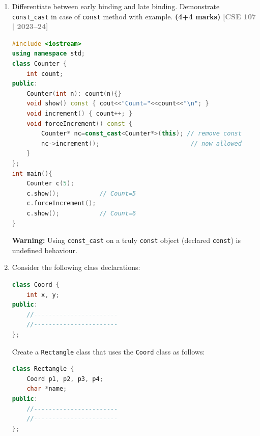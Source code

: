 \documentclass[12pt,a3paper]{article}
\newcommand{\yr}[1]{\hfill\textcolor{gray}{\small\textbf{[#1]}}}
\newcommand{\mk}[1]{\textcolor{orange!70!black}{\small\textbf{(#1 marks)}}}
\begin{document}
\begin{enumerate}
\item Differentiate between early binding and late binding. Demonstrate \texttt{const\_cast} in case of \texttt{const} method with example. \mk{4+4}
\yr{CSE 107 | 2023--24}

\begin{tcolorbox}[enhanced,breakable,ansbox,colback=cF!4,colframe=cF,
  boxrule=0.8pt,arc=5pt,
  title={\textbf{Answer --- const\_cast with const method example}},
  fonttitle=\bfseries\color{white},colbacktitle=cF]

\begin{lstlisting}[language=C++]
#include <iostream>
using namespace std;
class Counter {
    int count;
public:
    Counter(int n): count(n){}
    void show() const { cout<<"Count="<<count<<"\n"; }
    void increment() { count++; }
    void forceIncrement() const {
        Counter* nc=const_cast<Counter*>(this); // remove const
        nc->increment();                         // now allowed
    }
};
int main(){
    Counter c(5);
    c.show();           // Count=5
    c.forceIncrement();
    c.show();           // Count=6
}
\end{lstlisting}

\textbf{Warning:} Using \texttt{const\_cast} on a truly
\texttt{const} object (declared \texttt{const}) is undefined
behaviour.

\end{tcolorbox}

\item Consider the following class declarations:

\begin{lstlisting}[language=C++]
class Coord {
    int x, y;
public:
    //-----------------------
    //-----------------------
};
\end{lstlisting}

Create a \texttt{Rectangle} class that uses the \texttt{Coord} class as follows:

\begin{lstlisting}[language=C++]
class Rectangle {
    Coord p1, p2, p3, p4;
    char *name;
public:
    //-----------------------
    //-----------------------
};
\end{lstlisting}


\end{enumerate}
\end{document}
